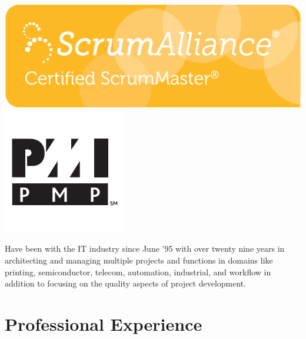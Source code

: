 \documentclass[a4paper,12pt]{article}
\begin{document}
\includegraphics[height=1.5\baselineskip]{agile}
\includegraphics[height=1.5\baselineskip]{pmp}

Have been with the IT industry since June '95 with over twenty nine years
in architecting and managing multiple projects and functions in
domains like printing, semiconductor, telecom, automation, industrial,
and workflow in addition to focusing on the quality aspects of project
development.

\section*{Professional Experience}
\end{document}
